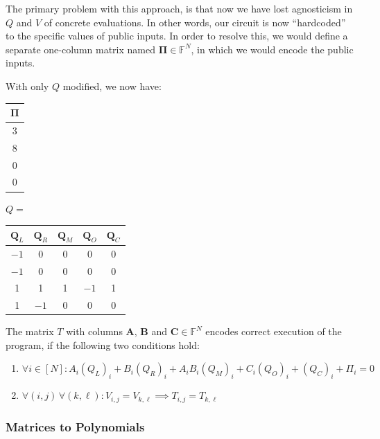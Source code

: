 \documentclass[../../book.tex]{subfiles}
\begin{document}
The primary problem with this approach, is that now we have lost agnosticism in
$Q$ and $V$ of concrete evaluations. In other words, our circuit is now
``hardcoded'' to the specific values of public inputs. In order to resolve this,
we would define a separate one-column matrix named $\boldsymbol{\Pi} \in \mathbb{F}^N$, in which
we would encode the public inputs.

\begin{example}
With only $Q$ modified, we now have:

\centering 
\begin{center}
\begin{tabular}{|c|}
\hline
\rowcolor{gray!30} $\boldsymbol{\Pi}$ \\ 
\hline
3 \\ 
\hline
8 \\ 
\hline
0 \\ 
\hline
0 \\ 
\hline
\end{tabular} \hspace{1cm}
$Q=$ 
\begin{tabular}{|c|c|c|c|c|}
\hline
\rowcolor{gray!30} $\mathbf{Q}_L$ & $\mathbf{Q}_R$ & $\mathbf{Q}_M$ & $\mathbf{Q}_O$ & $\mathbf{Q}_C$ \\ 
\hline
$-1$ & 0 & 0 & 0 & 0 \\ 
\hline
$-1$ & 0 & 0 & 0 & 0 \\ 
\hline
1 & 1 & 1 & $-1$ & 1 \\ 
\hline
1 & $-1$ & 0 & 0 & 0 \\ 
\hline
\end{tabular}
\end{center}
\end{example}

\begin{proposition}[Wrap-up]\label{prop:plonk-conditions}
The matrix $T$ with columns $\mathbf{A}$, $\mathbf{B}$ and $\mathbf{C} \in \mathbb{F}^N$ encodes correct execution of the program, if the following two conditions hold:
\begin{enumerate}
    \item \(\forall i \in [N]: A_i (Q_{L})_i + B_i(Q_{R})_i + A_i B_i (Q_{M})_i + C_i (Q_{O})_i + (Q_{C})_i + \Pi_i = 0\)
    \item \(\forall (i, j) \, \forall (k, \ell): V_{i,j} = V_{k,\ell} \implies T_{i,j} = T_{k,\ell}\)
\end{enumerate}
\end{proposition}

\subsubsection{Matrices to Polynomials}
\end{document}

